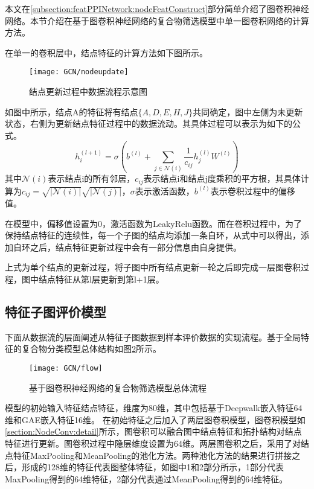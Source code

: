 本文在\ref{subsection:featPPINetwork:nodeFeatConstruct}部分简单介绍了图卷积神经网络。本节介绍在基于图卷积神经网络的复合物筛选模型中单一图卷积网络的计算方法。

在单一的卷积层中，结点特征的计算方法如下图所示。

\begin{figure}[htbp]
    \centering
    \texttt{[image: GCN/nodeupdate]}
    \caption{结点更新过程中数据流程示意图}
    \label{fig:GCN/nodeupdate}
\end{figure}
如图中所示，结点A的特征将有结点$\{A,D,E,H,J\}$共同确定，图中左侧为未更新状态，右侧为更新结点特征过程中的数据流动。其具体过程可以表示为如下的公式。
\begin{equation}
    \label{equ:normalgcn}
    h_i^{(l+1)} = \sigma(b^{(l)} + \sum_{j\in\mathcal{N}(i)}\frac{1}{c_{ij}}h_j^{(l)}W^{(l)})
\end{equation}
其中$\mathcal{N}(i)$表示结点i的所有邻居，${c_{ij}}$表示结点i和结点j度乘积的平方根，其具体计算为$c_{ij} = \sqrt{|\mathcal{N}(i)|}\sqrt{|\mathcal{N}(j)|}$，$\sigma$表示激活函数，$b^{(l)}$表示卷积过程中的偏移值。

在模型中，偏移值设置为0，激活函数为LeakyRelu函数。而在卷积过程中，为了保持结点特征的连续性，每一个子图的结点均添加一条自环，从式中可以得出，添加自环之后，结点特征更新过程中会有一部分信息由自身提供。

上式为单个结点的更新过程，将子图中所有结点更新一轮之后即完成一层图卷积过程，图中结点特征从第l层更新到第l+1层。

\subsection{特征子图评价模型}
\label{subsection:NodeConv:flow}

下面从数据流的层面阐述从特征子图数据到样本评价数据的实现流程。基于全局特征的复合物分类模型总体结构如图\ref{fig:GCN/flow}所示。
\begin{figure}[htbp]
    \centering
    \texttt{[image: GCN/flow]}
    \caption{基于图卷积神经网络的复合物筛选模型总体流程}
    \label{fig:GCN/flow}
\end{figure}
模型的初始输入特征结点特征，维度为80维，其中包括基于Deepwalk嵌入特征64维和GAE嵌入特征16维。
在初始特征之后加入了两层图卷积模型，图卷积模型如\ref{section:NodeConv:detail}所示，图卷积可以融合图中结点特征和拓扑结构对结点特征进行更新。图卷积过程中隐层维度设置为64维。两层图卷积之后，采用了对结点特征MaxPooling和MeanPooling的池化方法。两种池化方法的结果进行拼接之后，形成的128维的特征代表图整体特征，如图中1和2部分所示，1部分代表MaxPooling得到的64维特征，2部分代表通过MeanPooling得到的64维特征。

